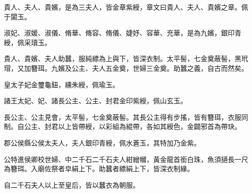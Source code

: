 \begin{pinyinscope}
 貴人、夫人、貴嬪，是為三夫人，皆金章紫綬，章文曰貴人、夫人、貴嬪之章。佩于闐玉。



 淑妃、淑媛、淑儀、脩華、脩容、脩儀、婕妤、容華、充華，是為九嬪，銀印青綬，佩采瓄玉。



 貴人、貴嬪、夫人助蠶，服純縹為上與下，皆深衣制。太平髻，七金奠蔽髻，黑玳瑁，又加簪珥。九嬪及公主、夫人五金奠，世婦三金奠。助蠶之義，自古而然矣。



 皇太子妃金璽龜鈕，纁朱綬，佩瑜玉。



 諸王太妃、妃、諸長公主、公主、封君金印紫綬，佩山玄玉。



 長公主、公主見會，太平髻，七金奠蔽髻。其長公主得有步搖，皆有簪珥，衣服同制。自公主、封君以上皆帶綬，以彩組為緄帶，各如其綬色，金闢邪首為帶玦。



 郡公侯縣公侯太夫人，夫人銀印青綬，佩水蒼玉，其特加乃金紫。



 公特進侯卿校世婦、中二千石二千石夫人紺繒幗，黃金龍首銜白珠，魚須擿長一尺為簪珥。入廟佐祭者皁絹上下。助蠶者縹絹上下，皆深衣制緣。



 自二千石夫人以上至皇后，皆以蠶衣為朝服。



\end{pinyinscope}